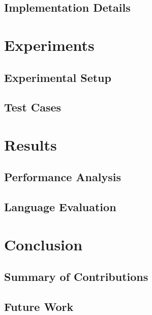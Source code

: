 \documentclass[12pt,a4paper]{article}
\begin{document}
\subsection{Implementation Details}

\section{Experiments}
\subsection{Experimental Setup}

\subsection{Test Cases}

\section{Results}
\subsection{Performance Analysis}

\subsection{Language Evaluation}

\section{Conclusion}
\subsection{Summary of Contributions}

\subsection{Future Work}





\appendix
\end{document}
